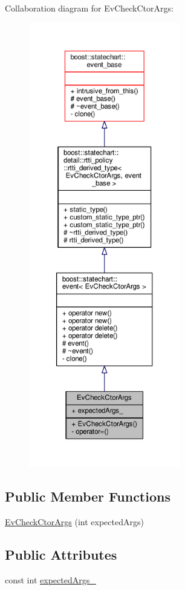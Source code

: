 Collaboration diagram for Ev\+Check\+Ctor\+Args\+:
\nopagebreak
\begin{figure}[H]
\begin{center}
\leavevmode
\includegraphics[height=550pt]{struct_ev_check_ctor_args__coll__graph}
\end{center}
\end{figure}
\subsection*{Public Member Functions}
\begin{DoxyCompactItemize}
\item 
\mbox{\hyperlink{struct_ev_check_ctor_args_aa45ad084e2237206f2646ac82ff56444}{Ev\+Check\+Ctor\+Args}} (int expected\+Args)
\end{DoxyCompactItemize}
\subsection*{Public Attributes}
\begin{DoxyCompactItemize}
\item 
const int \mbox{\hyperlink{struct_ev_check_ctor_args_a6c8beab5e90ea1802c8b53a1f87cb5d5}{expected\+Args\+\_\+}}
\end{DoxyCompactItemize}
